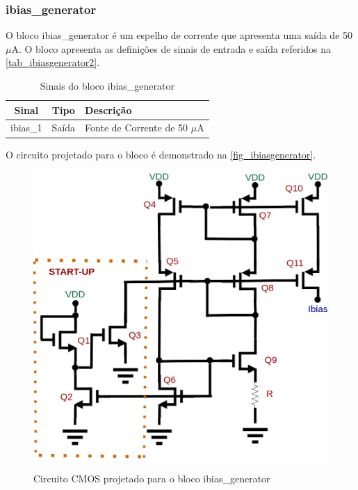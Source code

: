 \renewcommand{\NomeBloco}{ibias\_generator}
\renewcommand{\NomeBlocoNoUnderline}{ibiasgenerator}
\renewcommand{\NomePTab}{tab_\NomeBlocoNoUnderline}
\renewcommand{\NomeSTab}{tab_\NomeBlocoNoUnderline2}
\renewcommand{\NomePFig}{fig_\NomeBlocoNoUnderline}
\renewcommand{\NomeSFig}{fig_\NomeBlocoNoUnderline2}
\renewcommand{\NomeTTab}{tab_\NomeBlocoNoUnderline3}
\renewcommand{\NomeQTab}{tab_\NomeBlocoNoUnderline4}

\subsubsection{\NomeBloco}

O bloco \NomeBloco{} \'e um espelho de corrente que apresenta uma sa\'ida de 50 $\mu$A. O bloco apresenta as defini{\c c}\~oes de sinais de entrada e sa\'ida referidos na \autoref{\NomeSTab}.

\begin{table}[htbp]
\caption{Sinais do bloco \NomeBloco}
\label{\NomeSTab}
\centering
\begin{tabular}{ccl}

    \toprule
    Sinal & Tipo    & Descri{\c c}\~ao        \\
    \midrule \midrule
    ibias\_1   & Saída   & Fonte de Corrente de 50 $\mu$A \\
    \bottomrule
\end{tabular}
\end{table}

O circuito projetado para o bloco \'e demonstrado na \autoref{\NomePFig}.

\begin{figure}[htb]
 \centering
    \centering
    \caption{Circuito CMOS projetado para o bloco \NomeBloco} 
    \includegraphics[scale=0.3]{Circuitos/Ibias_generator.png}
    \label{\NomePFig}
\end{figure}

